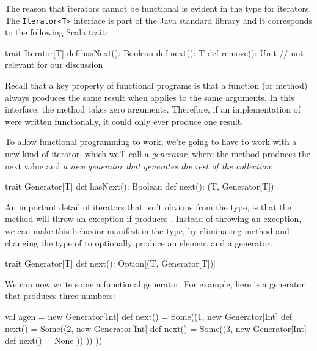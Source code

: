 \documentclass[9pt]{extbook}
\begin{document}
The reason that iterators cannot be functional is evident in the type for iterators. The
\verb|Iterator<T>| interface is part of the Java standard library and it corresponds to
the following Scala trait:
\begin{scalacode}
trait Iterator[T] {
  def hasNext(): Boolean
  def next(): T
  def remove(): Unit // not relevant for our discussion
}
\end{scalacode}
Recall that a key property of functional programs is that a function (or method) always produces
the same result when applies to the same arguments. In this interface, the  method
takes zero arguments. Therefore, if an implementation of  were written
functionally, it could only ever produce one result.

To allow functional programming to work, we're going to have to work with a new kind of iterator,
which we'll call a \emph{generator}, where the  method produces the next value
and \emph{a new generator that generates the rest of the collection}:
%
\begin{scalacode}
trait Generator[T] {
  def hasNext(): Boolean
  def next(): (T, Generator[T])
}
\end{scalacode}

An important detail of iterators that isn't obvious from the type, is that the  method
will throw an exception if  produces .  Instead of throwing an exception,
we can make this behavior manifest in the type, by eliminating  method and changing the type
of  to optionally produce an element and a generator.
%
\begin{scalacode}
trait Generator[T] {
  def next(): Option[(T, Generator[T])]
}
\end{scalacode}

We can now write some a functional generator. For example, here is a generator that produces three numbers:
\begin{scalacode}
val agen = new Generator[Int] {
  def next() = Some((1, new Generator[Int] {
                          def next() = Some((2, new Generator[Int] {
                                                 def next() = Some((3, new Generator[Int] {
                                                                        def next() = None
                                                                       }))
                                                }))
                        }))
}
\end{scalacode}
\end{document}
